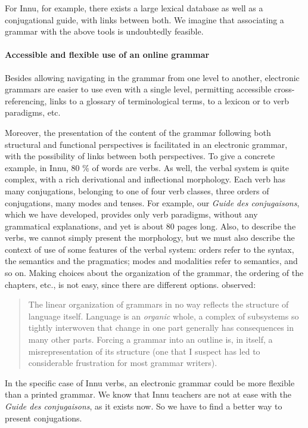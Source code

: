 For Innu, for example, there exists a large lexical database as well as a conjugational guide, with links between both. We imagine that associating a grammar with the above tools is undoubtedly feasible.

\paragraph{Accessible and flexible use of an online grammar}
Besides allowing navigating in the grammar from one level to another, electronic grammars are easier to use even with a single level, permitting accessible cross-referencing, links to a glossary of terminological terms, to a lexicon or to verb paradigms, etc. 

Moreover, the presentation of the content of the grammar following both structural and functional perspectives is facilitated in an electronic grammar, with the possibility of links between both perspectives. To give a concrete example, in Innu, 80 \% of words are verbs. As well, the verbal system is quite complex, with a rich derivational and inflectional morphology. Each verb has many conjugations, belonging to one of four verb classes, three orders of conjugations, many modes and tenses. For example, our \textit{Guide des conjugaisons}, which we have developed, provides only verb paradigms, without any grammatical explanations, and yet is about 80 pages long. Also, to describe the verbs, we cannot simply present the morphology, but we must also describe the context of use of some features of the verbal system: orders refer to the syntax, the semantics and the pragmatics; modes and modalities refer to semantics, and so on. Making choices about the organization of the grammar, the ordering of the chapters, etc., is not easy, since there are different options.  \citet[2]{Weber2000} observed:

\begin{quote}
 The linear organization of grammars in no way reflects the structure of language itself. Language is an \textit{organic} whole, a complex of subsystems so tightly interwoven that change in one part generally has consequences in many other parts. Forcing a grammar into an outline is, in itself, a misrepresentation of its structure (one that I suspect has led to considerable frustration for most grammar writers).
\end{quote}

In the specific case of Innu verbs, an electronic grammar could be more flexible than a printed grammar. We know that Innu teachers are not at ease with the \textit{Guide des conjugaisons}, as it exists now. So we have to find a better way to present conjugations.

